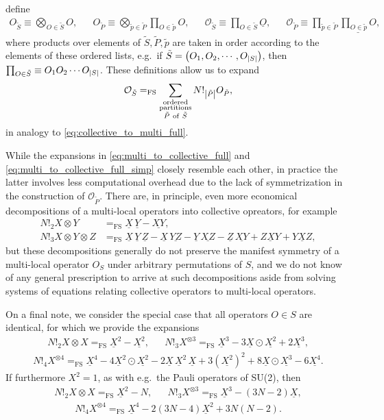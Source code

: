 \documentclass[nofootinbib,notitlepage,11pt]{revtex4-2}
\renewcommand{\t}{\text} %
\newcommand{\p}[1]{\left(#1\right)} %
\newcommand{\1}{\mathds{1}}
\renewcommand{\O}{\mathcal{O}}
\newcommand{\EQFS}{=_{\text{FS}}}
\newcommand{\col}{\underline}
\begin{document}
define
\begin{align}
  O_{\tilde S} \equiv \bigotimes_{O\in\tilde S} O,
  &&
  O_{\tilde P}
  \equiv \bigotimes_{\tilde p\in\tilde P} \prod_{O\in\tilde p} O,
  &&
  \O_{\tilde S} \equiv \prod_{O\in\tilde S} \col{O},
  &&
  \O_{\tilde P}
  \equiv \prod_{\tilde p\in\tilde P}
  \col{\textstyle\prod_{O\in\tilde p} O},
\end{align}
where products over elements of $\tilde S,\tilde P,\tilde p$ are taken
in order according to the elements of these ordered lists, e.g.~if
$\tilde S=\p{O_1,O_2,\cdots,O_{\abs{S}}}$, then
$\prod_{O\in\tilde S}\equiv O_1O_2\cdots O_{\abs{S}}$.  These
definitions allow us to expand
\begin{align}
  \O_{\tilde S} \EQFS
  \sum_{\substack{\t{ordered}\\\t{partitions}\\\tilde P~\t{of}~\tilde S}}
  N!_{\abs{\tilde P}} O_{\tilde P},
\end{align}
in analogy to \eqref{eq:collective_to_multi_full}.

While the expansions in \eqref{eq:multi_to_collective_full} and
\eqref{eq:multi_to_collective_full_simp} closely resemble each other,
in practice the latter involves less computational overhead due to the
lack of symmetrization in the construction of $\O_{\tilde P}$.  There
are, in principle, even more economical decompositions of a
multi-local operators into collective opreators, for example
\begin{align}
  N!_2 X\otimes Y
  &\EQFS \col{X}\,\col{Y} - \col{XY}, \\
  N!_3 X\otimes Y \otimes Z
  &\EQFS \col{X}\,\col{Y}\,\col{Z}
  - \col{X}\,\col{YZ} - \col{Y}\,\col{XZ} - \col{Z}\,\col{XY}
  + \col{ZXY} + \col{YXZ},
\end{align}
but these decompositions generally do not preserve the manifest
symmetry of a multi-local operator $O_S$ under arbitrary permutations
of $S$, and we do not know of any general prescription to arrive at
such decompositions aside from solving systems of equations relating
collective operators to multi-local operators.

On a final note, we consider the special case that all operators
$O\in S$ are identical, for which we provide the expansions
\begin{align}
  N!_2 X\otimes X \EQFS \col{X}^2 - \col{X^2},
  &&
  N!_3 X^{\otimes 3} \EQFS \col{X}^3
  - 3 \col{X} \odot \col{X^2} + 2\col{X^3},
\end{align}
\begin{align}
  N!_4 X^{\otimes 4}
  \EQFS \col{X}^4 - 4 \col{X}^2 \odot \col{X^2}
  - 2 \col{X} \, \col{X}^2 \, \col{X}
  + 3 \p{\col{X^2}}^2 + 8 \col{X} \odot \col{X^3}
  - 6 \col{X^4}.
\end{align}
If furthermore $X^2=1$, as with e.g.~the Pauli operators of SU(2),
then
\begin{align}
  N!_2 X\otimes X \EQFS \col{X}^2 - N,
  &&
  N!_3 X^{\otimes 3} \EQFS \col{X}^3 - \p{3N-2} \col{X},
\end{align}
\begin{align}
  N!_4 X^{\otimes 4} \EQFS \col{X}^4
  - 2\p{3N-4} \col{X}^2 + 3 N \p{N-2}.
\end{align}


\end{document}
